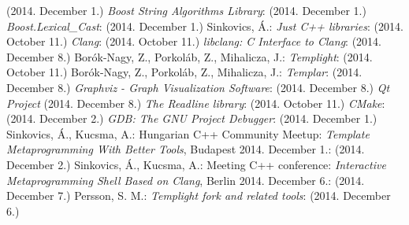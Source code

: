 \begin{thebibliography}{99}
    (2014. December 1.)
    \textit{Boost String Algorithms Library}:
    (2014. December 1.)
    \textit{Boost.Lexical\_Cast}:
    (2014. December 1.)
    Sinkovics, Á.:
    \textit{Just C++ libraries}:
     (2014. October 11.)
    \textit{Clang}:
     (2014. October 11.)
    \textit{libclang: C Interface to Clang}:
     (2014. December 8.)
    Borók-Nagy, Z., Porkoláb, Z., Mihalicza, J.:
    \textit{Templight}:
     (2014. October 11.)
    Borók-Nagy, Z., Porkoláb, Z., Mihalicza, J.:
    \textit{Templar}:
     (2014. December 8.)
    \textit{Graphviz - Graph Visualization Software}:
     (2014. December 8.)
    \textit{Qt Project}
     (2014. December 8.)
    \textit{The Readline library}:
    (2014. October 11.)
    \textit{CMake}:
    (2014. December 2.)
    \textit{GDB: The GNU Project Debugger}:
    (2014. December 1.)
    Sinkovics, Á., Kucsma, A.:
    Hungarian C++ Community Meetup:
    \textit{Template Metaprogramming With Better Tools}, Budapest 2014.
    December 1.:
    (2014. December 2.)
    Sinkovics, Á., Kucsma, A.:
    Meeting C++ conference:
    \textit{Interactive Metaprogramming Shell Based on Clang}, Berlin 2014.
    December 6.:
    (2014. December 7.)
    Persson, S. M.:
    \textit{Templight fork and related tools}:
    (2014. December 6.)
\end{thebibliography}
